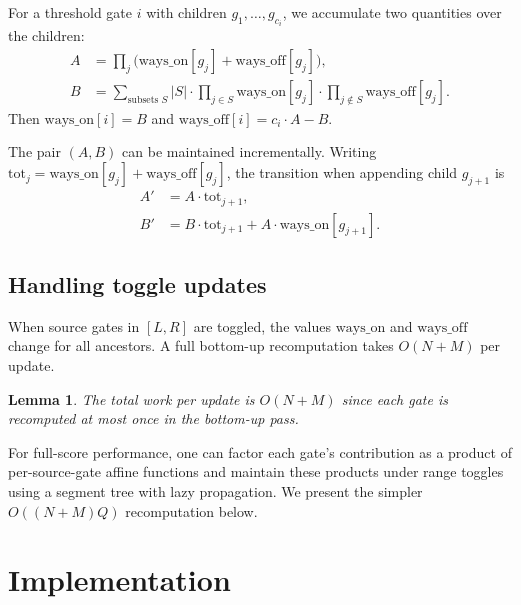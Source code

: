 \documentclass[11pt,a4paper]{article}
\newtheorem{lemma}[theorem]{Lemma}
\begin{document}
For a threshold gate $i$ with children $g_1, \ldots, g_{c_i}$, we accumulate
two quantities over the children:
\begin{align*}
  A &= \prod_j \bigl(\mathrm{ways\_on}[g_j] + \mathrm{ways\_off}[g_j]\bigr),\\
  B &= \sum_{\text{subsets }S}
       |S| \cdot \prod_{j \in S} \mathrm{ways\_on}[g_j]
             \cdot \prod_{j \notin S} \mathrm{ways\_off}[g_j].
\end{align*}
Then $\mathrm{ways\_on}[i] = B$ and
$\mathrm{ways\_off}[i] = c_i \cdot A - B$.

The pair $(A, B)$ can be maintained incrementally.  Writing
$\mathrm{tot}_j = \mathrm{ways\_on}[g_j] + \mathrm{ways\_off}[g_j]$,
the transition when appending child $g_{j+1}$ is
\begin{align*}
  A' &= A \cdot \mathrm{tot}_{j+1},\\
  B' &= B \cdot \mathrm{tot}_{j+1} + A \cdot \mathrm{ways\_on}[g_{j+1}].
\end{align*}

\subsection{Handling toggle updates}

When source gates in $[L,R]$ are toggled, the values
$\mathrm{ways\_on}$ and $\mathrm{ways\_off}$ change for all ancestors.
A full bottom-up recomputation takes $O(N + M)$ per update.

\begin{lemma}
The total work per update is $O(N + M)$ since each gate is recomputed
at most once in the bottom-up pass.
\end{lemma}

For full-score performance, one can factor each gate's contribution
as a product of per-source-gate affine functions and maintain these
products under range toggles using a segment tree with lazy
propagation.  We present the simpler $O((N+M)Q)$ recomputation below.

\section{Implementation}
\end{document}
